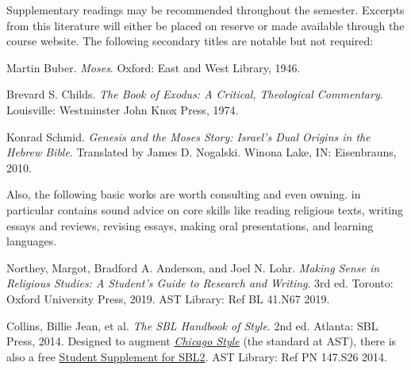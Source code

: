 \documentclass[titlepage]{article}
\begin{document}
Supplementary readings may be recommended throughout the semester.
Excerpts from this literature will either be placed on reserve or made
available through the course website. The following secondary titles are
notable but not required:

\begingroup
\renewcommand{\section}[2]{}%
\begin{thebibliography}{Childs}%

	 Martin Buber.
	\emph{Moses}.
	Oxford: East and West Library, 1946.
	
	 Brevard S. Childs.
	\emph{The Book of Exodus: A Critical, Theological Commentary}.
	Louisville: Westminster John Knox Press, 1974.

	 Konrad Schmid.
	\emph{Genesis and the Moses Story: Israel’s Dual Origins in the Hebrew Bible}. Translated by James D. Nogalski.
	Winona Lake, IN: Eisenbrauns, 2010.

\end{thebibliography}
\endgroup%

Also, the following basic works are worth consulting and even owning.
\cite{rlgs} in particular contains sound advice on core skills like
reading religious texts, writing essays and reviews, revising essays,
making oral presentations, and learning languages.

\begingroup
\renewcommand{\section}[2]{}%
\begin{thebibliography}{9}%

	 Northey, Margot, Bradford A. Anderson, and Joel N. Lohr.
	\emph{Making Sense in Religious Studies: A Student's Guide to Research and Writing}.
	3rd ed. Toronto: Oxford University Press, 2019. AST Library: Ref BL 41.N67 2019.

	 Collins, Billie Jean, et al.
	\emph{The SBL Handbook of Style}.
	2nd ed. Atlanta: SBL Press, 2014.
	Designed to augment \href{https://proxy.openathens.net/login?qurl=https%3A%2F%2Fwww.chicagomanualofstyle.org%2Fbook%2Fed17%2Ffrontmatter%2Ftoc.html}{\emph{Chicago Style}}
	(the standard at AST), there is also a free
	\href{https://www.sbl-site.org/wp-content/uploads/2025/04/SBLHSsupp2015-02.pdf}{Student Supplement for SBL2}. AST Library: Ref PN 147.S26 2014.

\end{thebibliography}
\endgroup
\end{document}
